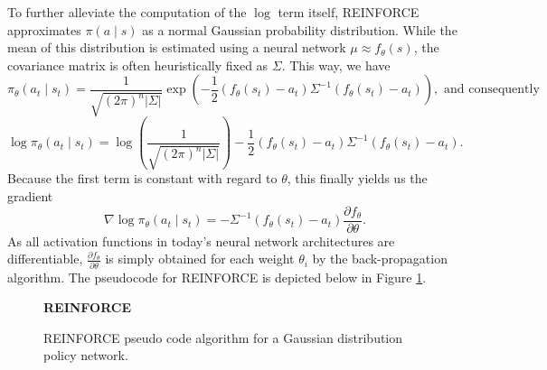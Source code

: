\documentclass[a4paper, 11pt]{article}
\begin{document}
	To further alleviate the computation of the $\log$ term itself, REINFORCE approximates $\pi(a\mid s)$ as a normal Gaussian probability distribution. While the mean of this distribution is estimated using a neural network $\mu \approx f_\theta(s)$, the covariance matrix is often heuristically fixed as $\Sigma$.
	This way, we have
	\[\pi_\theta(a_t\mid s_t)=\frac{1}{\sqrt{(2\pi)^n|\Sigma|}}\exp\left(-\frac{1}{2}(f_{\theta}(s_t)-a_t)\Sigma^{-1}(f_{\theta}(s_t)-a_t)\right), \text{ and consequently}\]
	\[\log\pi_\theta(a_t\mid s_t)=\log\left(\frac{1}{\sqrt{(2\pi)^n|\Sigma|}}\right)  -\frac{1}{2}(f_{\theta}(s_t)-a_t)\Sigma^{-1}(f_{\theta}(s_t)-a_t).\]
	Because the first term is constant with regard to $\theta$, this finally yields us the gradient
	\[\nabla\log\pi_\theta(a_t\mid s_t)=-\Sigma^{-1}(f_{\theta}(s_t)-a_t)\frac{\partial f_\theta}{\partial \theta}.\]
	As all activation functions in today's neural network architectures are differentiable, $\frac{\partial f_\theta}{\partial \theta}$ is simply obtained for each weight $\theta_i$ by the back-propagation algorithm. The pseudocode for REINFORCE is depicted below in Figure \ref{fig:reinforce}.
	
	\begin{figure}[H]
		\begin{algorithm}[H]
			\caption{\textbf{REINFORCE}}
			\small %
			\raggedright
			\renewcommand{\algorithmicrequire}{\textbf{Initialize:}} %
			\begin{algorithmic}[1]
				\ENDFOR
				\ENDFOR
				\ENDWHILE
			\end{algorithmic}
		\end{algorithm}
		\caption{REINFORCE pseudo code algorithm for a Gaussian distribution policy network.}
		\label{fig:reinforce}
	\end{figure}
	
\end{document}
